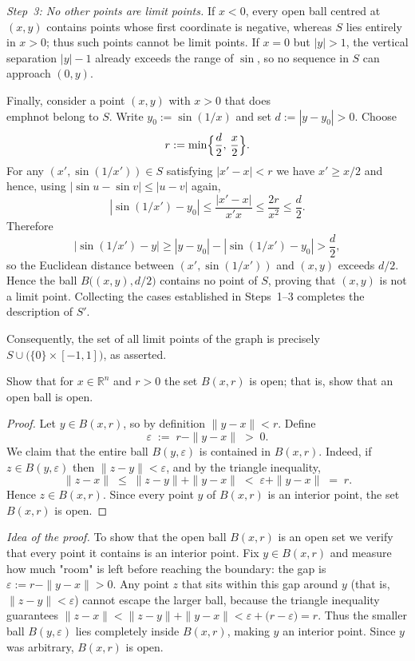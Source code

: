 \documentclass[10pt]{extarticle}
\begin{document}
\begin{solution}
    \medskip
    \emph{Step~3:  No other points are limit points.}  If $x<0$, every open ball centred at $(x,y)$ contains points whose first coordinate is negative, whereas $S$ lies entirely in $x>0$; thus such points cannot be limit points.  If $x=0$ but $|y|>1$, the vertical separation $|y|-1$ already exceeds the range of $\sin$, so no sequence in $S$ can approach $(0,y)$.

    Finally, consider a point $(x,y)$ with $x>0$ that does \\emph{not} belong to $S$.  Write $y_{0}:=\sin(1/x)$ and set $d:=|y-y_{0}|>0$.  Choose
    $$
        r:=\min\Bigl\{\frac{d}{2},\,\frac{x}{2}\Bigr\}.
    $$
    For any $(x',\sin(1/x'))\in S$ satisfying $|x'-x|<r$ we have $x'\ge x/2$ and hence, using $|\sin u-\sin v|\le|u-v|$ again,
    $$
        |\sin(1/x')-y_{0}|\le \frac{|x'-x|}{x' x}\le \frac{2r}{x^{2}}\le \frac{d}{2}.
    $$
    Therefore
    $$
        |\sin(1/x')-y|\ge |y-y_{0}|-|\sin(1/x')-y_{0}|>\frac{d}{2},
    $$
    so the Euclidean distance between $(x',\sin(1/x'))$ and $(x,y)$ exceeds $d/2$.  Hence the ball $B\bigl((x,y),d/2\bigr)$ contains no point of $S$, proving that $(x,y)$ is not a limit point.  Collecting the cases established in Steps~1--3 completes the description of $S'$.

    \medskip
    Consequently, the set of all limit points of the graph is precisely $S\cup\bigl(\{0\}\times[-1,1]\bigr)$, as asserted.
\end{solution}

\begin{exercise}[4.3]
    Show that for $x \in \mathbb{R}^n$ and $r>0$ the set $B(x , r)$ is open; that is, show that an open ball is open.
\end{exercise}

\begin{proof}
    Let $y \in B(x,r)$, so by definition $\|y-x\| < r$.  Define
    $$
        \varepsilon \;:=\; r - \|y-x\| \;>\; 0.
    $$
    We claim that the entire ball $B(y,\varepsilon)$ is contained in $B(x,r)$.  Indeed, if $z \in B(y,\varepsilon)$ then $\|z-y\| < \varepsilon$, and by the triangle inequality,
    $$
        \|z-x\| \;\le\; \|z-y\| + \|y-x\| \;<\; \varepsilon + \|y-x\| \;=\; r.
    $$
    Hence $z \in B(x,r)$.  Since every point $y$ of $B(x,r)$ is an interior point, the set $B(x,r)$ is open.
\end{proof}

\begin{remark}
    \emph{Idea of the proof.}  To show that the open ball $B(x,r)$ is an open set we verify that every point it contains is an interior point.  Fix $y\in B(x,r)$ and measure how much "room" is left before reaching the boundary: the gap is $\varepsilon:=r-\|y-x\|>0$.  Any point $z$ that sits within this gap around $y$ (that is, $\|z-y\|<\varepsilon$) cannot escape the larger ball, because the triangle inequality guarantees $\|z-x\|<\|z-y\|+\|y-x\|<\varepsilon+\bigl(r-\varepsilon\bigr)=r$.  Thus the smaller ball $B(y,\varepsilon)$ lies completely inside $B(x,r)$, making $y$ an interior point.  Since $y$ was arbitrary, $B(x,r)$ is open.
\end{remark}
\end{document}
